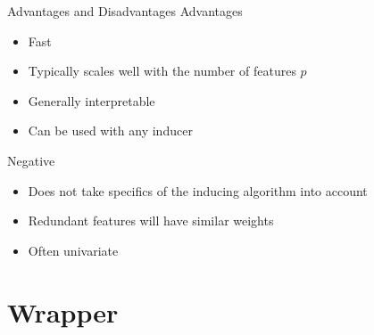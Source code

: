\documentclass[11pt,compress,t,notes=noshow, xcolor=table]{beamer}
\begin{document}
\begin{frame}{}
 
\end{frame}

\begin{frame}{Advantages and Disadvantages}
    Advantages
    \begin{itemize}
        \item Fast
        \item Typically scales well with the number of features $p$
        \item Generally interpretable
        \item Can be used with any inducer
    \end{itemize}
    Negative
    \begin{itemize}
        \item Does not take specifics of the inducing algorithm into account
        \item Redundant features will have similar weights
        \item Often univariate
    \end{itemize}
\end{frame}

\section{Wrapper}

\begin{frame}{}
 
\end{frame}

\begin{frame}{}
 
\end{frame}

\begin{frame}{}
 
\end{frame}


\begin{frame}{}
 
\end{frame}
\end{document}
